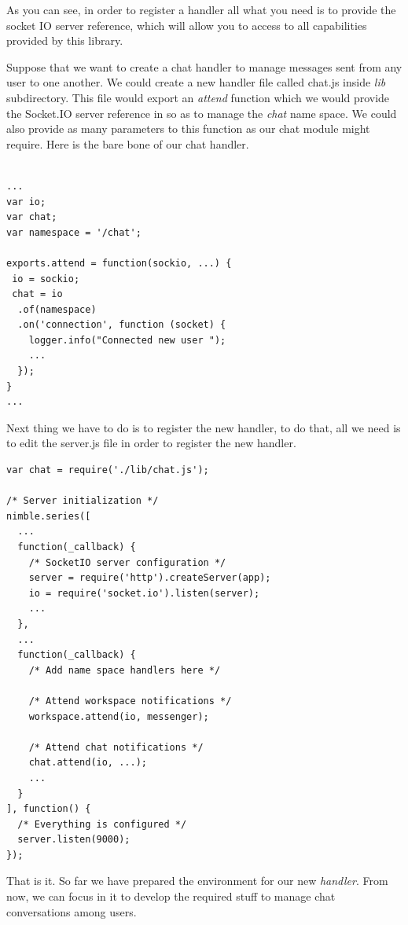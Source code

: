 \documentclass{article}
\begin{document}
As you can see, in order to register a handler all what you need is to provide the socket IO server reference, which will allow you to access to all capabilities provided by this library.

Suppose that we want to create a chat handler to manage messages sent from any user to one another. We could create a new handler file called chat.js inside \textit{lib} subdirectory. This file would export an \textit{attend} function which we would provide the Socket.IO server reference in so as to manage the \textit{chat} name space. We could also provide as many parameters to this function as our chat module might require. Here is the bare bone of our chat handler.

\begin{verbatim}

...
var io;
var chat;
var namespace = '/chat';

exports.attend = function(sockio, ...) {
 io = sockio;
 chat = io
  .of(namespace)
  .on('connection', function (socket) {
    logger.info("Connected new user ");
    ...
  });
}
...
\end{verbatim}

Next thing we have to do is to register the new handler, to do that, all we need is to edit the server.js file in order to register the new handler.

\begin{verbatim}
var chat = require('./lib/chat.js');

/* Server initialization */
nimble.series([
  ...
  function(_callback) {
    /* SocketIO server configuration */
    server = require('http').createServer(app);
    io = require('socket.io').listen(server);
    ...
  },
  ...
  function(_callback) {
    /* Add name space handlers here */

    /* Attend workspace notifications */
    workspace.attend(io, messenger);

    /* Attend chat notifications */
    chat.attend(io, ...);
    ...
  }
], function() {
  /* Everything is configured */
  server.listen(9000);
});
\end{verbatim}

That is it. So far we have prepared the environment for our new \textit{handler}. From now, we can focus in it to develop the required stuff to manage chat conversations among users.
\end{document}
